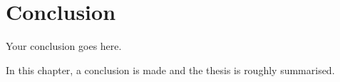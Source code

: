 \chapter{Conclusion}
\label{Chapter::Conclusion}
Your conclusion goes here.

In this chapter, a conclusion is made and the thesis is roughly summarised.

